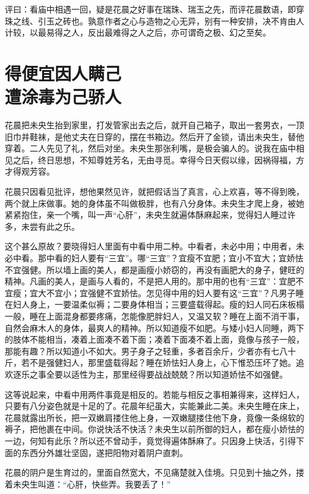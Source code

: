\documentclass[a4paper,12pt,UTF8,twoside]{ctexbook}
\begin{document}
评曰：看庙中相遇一回，疑是花晨之好事在瑞珠、瑞玉之先，而评花晨数语，即穿珠之线、引玉之砖也。孰意作者之心与造物之心无异，别有一种安排，决不肯由人计较，以最易得之人，反出最难得之人之后，亦可谓奇之极、幻之至矣。

\chapter[得便宜因人瞒己\ 遭涂毒为己骄人]{得便宜因人瞒己\\遭涂毒为己骄人}

花晨把未央生抬到家里，打发管家出去之后，就开自己箱子，取出一套男衣，一顶旧巾并鞋袜，是他丈夫在日穿的，摆在书箱边。然后开了金锁，请出未央生，替他穿着。二人先见了礼，然后对坐。未央生那张利嘴，是极会骗人的。说我在庙中相见之后，终日思想，不知尊姓芳名，无由寻觅。幸得今日天假以缘，因祸得福，方才得观芳容。

花晨只因看见批评，想他果然见许，就把假话当了真言，心上欢喜，等不得到晚，两个就上床做事。她的身体虽不叫做极胖，也有八分身体。未央生才爬上身，被她紧紧抱住，亲一个嘴，叫一声“心肝”，未央生就遍体酥麻起来，觉得妇人睡过许多，未尝有此之乐。

这个甚么原故？要晓得妇人里面有中看中用二种。中看者，未必中用；中用者，未必中看。那中看的妇人要有“三宜”。哪“三宜”？宜瘦不宜肥；宜小不宜大；宜娇怯不宜强健。所以墙上画的美人，都是画瘦小娇窃的，再没有画肥大的身子，健旺的精神。凡画的美人，是画与人看的，不是把人用的。那中用的也有“三宜”：宜肥不宜瘦；宜大不宜小；宜强健不宜娇怯。怎见得中用的妇人要有这“三宜”？凡男子睡在妇人身上，一要温柔似褥；二要身体相当；三要盛载得起。瘦的妇人同石床板榻一般，睡在上面混身都要疼痛，怎能像肥胖妇人，又温又软？睡在上面不消干事，自然会麻木人的身体，最爽人的精神。所以知道瘦不如肥。与矮小妇人同睡，两下的肢体不能相当，凑着上面凑不着下面；凑着下面凑不着上面，竟像与孩子一般，那能有趣？所以知道小不如大。男子身子之轻重，多者百余斤，少者亦有七八十斤，若不是强健妇人，那里盛载得起？睡在娇怯妇人身上，心下惟恐压坏了她。追欢逐乐之事全要以适性为主，那里经得要战战兢兢？所以知道娇怯不如强健。

这等说起来，中看中用两件事竟是相反的。若能与相反之事相兼得来，这样妇人，只要有八分姿色就是十足的了。花晨年纪虽大，实能兼此二美。未央生睡在床上，花晨就露出所长，把一双嫩肩搂住他上身，一双嫩腿搂住他下身，竟像一条绵软的褥子，把他裹在中间。你说快活不快活？未央生以前所御的妇人，都在瘦小娇怯的一边，何知有此乐？所以还不曾动手，竟觉得遍体酥麻了。只因身上快活，引得下面的东西分外雄壮坚固，遂把阳物对着阴户直刺。

花晨的阴户是生育过的，里面自然宽大，不见痛楚就入佳境。只见到十抽之外，搂着未央生叫道：“心肝，快些弄。我要丢了！”
\end{document}
